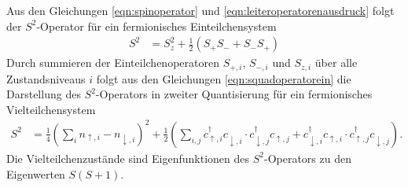 Aus den Gleichungen \eqref{eqn:spinoperator} und \eqref{eqn:leiteroperatorenausdruck} folgt der $S^2$-Operator für ein fermionisches Einteilchensystem
\begin{align}
  S^2 & = S_z^2 + \frac12 \left( S_+ S_- + S_- S_+ \right)
  \label{eqn:squadoperatorein}
\end{align}
Durch summieren der Einteilchenoperatoren $S_{+,i}$, $S_{-,i}$ und $S_{z,i}$ über alle Zustandsniveaus $i$ folgt aus den Gleichungen \eqref{eqn:squadoperatorein} die Darstellung des $S^2$-Operators in zweiter Quantisierung für ein fermionisches Vielteilchensystem
\begin{align}
  S^2 & = \frac14 \left(\sum_{i} n_{\uparrow,i} - n_{\downarrow,i}\right)^2 +
  \frac12 \left( \sum_{i,j} c_{\uparrow,i}^\dag c_{\downarrow,i}^{\phantom{\dag}} \cdot c_{\downarrow,j}^\dag c_{\uparrow,j}^{\phantom{\dag}} + c_{\downarrow,i}^\dag c_{\uparrow,i}^{\phantom{\dag}} \cdot c_{\uparrow,j}^\dag c_{\downarrow,j}^{\phantom{\dag}} \right).
  \label{eqn:squadoperatorviel}
\end{align}
Die Vielteilchenzustände sind Eigenfunktionen des $S^2$-Operators zu den Eigenwerten $S(S+1)$.
\cite{???}
